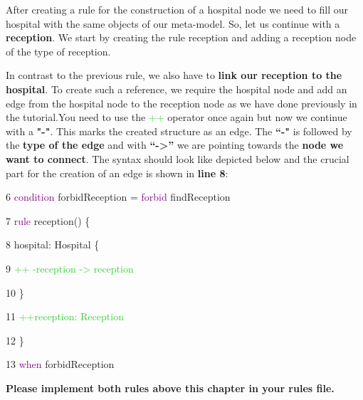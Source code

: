 After creating a rule for the construction of a hospital node we need to fill our hospital with the same objects of our meta-model. So, let us continue with a \textbf{reception}. We start by creating the rule \textsf{reception} and adding a reception node of the type of reception.\newline

In contrast to the previous rule, we also have to \textbf{link our reception to the hospital}. To create such a reference, we require the hospital node and add an edge from the hospital node to the reception node as we have done previously in the tutorial.\newline You need to use the \textcolor{LimeGreen}{++} operator once again but now we continue with a \textbf{"-"}. This marks the created structure as an edge. The \textbf{“-"} is followed by the \textbf{type of the edge} and with \textbf{“->”} we are pointing towards the \textbf{node we want to connect}.\newline
The syntax should look like depicted below and the crucial part for the creation of an edge is shown in \textbf{line 8}:\newline

{

6 \hspace{0.5cm}\textcolor{Purple}{condition} forbidReception = \textcolor{Purple}{forbid} findReception

7 \hspace{0.5cm}\textcolor{Purple}{rule} reception() \{

8 \hspace{1cm}     hospital: Hospital \{

9 \hspace{1.5cm}       \textcolor{LimeGreen}{++ -reception -> reception}

10 \hspace{1.5cm}	 \}

11 \hspace{0.5cm}	 \textcolor{LimeGreen}{++reception: Reception}

12 \hspace{0.5cm}\}

13 \hspace{0.5cm}\textcolor{Purple}{when} forbidReception \newline

}

\textbf{Please implement both rules above this chapter in your rules file.}\newline

